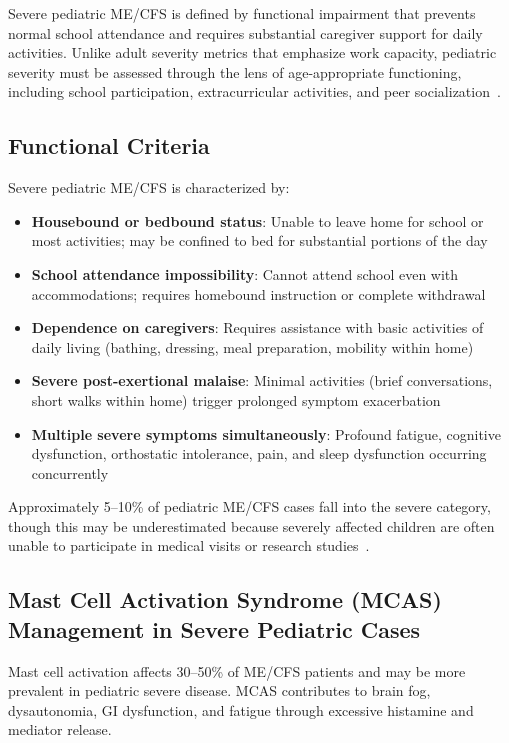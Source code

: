 Severe pediatric ME/CFS is defined by functional impairment that prevents normal school attendance and requires substantial caregiver support for daily activities. Unlike adult severity metrics that emphasize work capacity, pediatric severity must be assessed through the lens of age-appropriate functioning, including school participation, extracurricular activities, and peer socialization~\cite{Rowe2017pediatric}.

\subsection{Functional Criteria}

Severe pediatric ME/CFS is characterized by:

\begin{itemize}
    \item \textbf{Housebound or bedbound status}: Unable to leave home for school or most activities; may be confined to bed for substantial portions of the day
    \item \textbf{School attendance impossibility}: Cannot attend school even with accommodations; requires homebound instruction or complete withdrawal
    \item \textbf{Dependence on caregivers}: Requires assistance with basic activities of daily living (bathing, dressing, meal preparation, mobility within home)
    \item \textbf{Severe post-exertional malaise}: Minimal activities (brief conversations, short walks within home) trigger prolonged symptom exacerbation
    \item \textbf{Multiple severe symptoms simultaneously}: Profound fatigue, cognitive dysfunction, orthostatic intolerance, pain, and sleep dysfunction occurring concurrently
\end{itemize}

Approximately 5--10\% of pediatric ME/CFS cases fall into the severe category, though this may be underestimated because severely affected children are often unable to participate in medical visits or research studies~\cite{Rowe2020severeME}.

\subsection{Mast Cell Activation Syndrome (MCAS) Management in Severe Pediatric Cases}
\label{subsec:ped-severe-mcas}

Mast cell activation affects 30--50\% of ME/CFS patients and may be more prevalent in pediatric severe disease. MCAS contributes to brain fog, dysautonomia, GI dysfunction, and fatigue through excessive histamine and mediator release.

